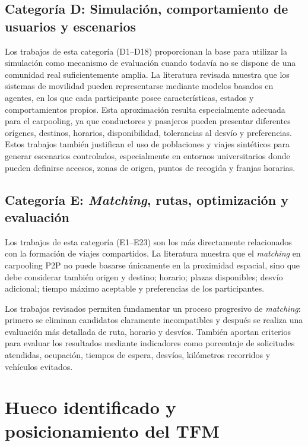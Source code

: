 \subsection{Categoría D: Simulación, comportamiento de usuarios y escenarios}

Los trabajos de esta categoría (D1--D18) \cite{D1,D2,D3,D4,D5,D6,D7,D8,D9,D10,D11,D12,D13,D14,D15,D16,D17,D18} proporcionan la base para utilizar la simulación como mecanismo de evaluación cuando todavía no se dispone de una comunidad real suficientemente amplia. La literatura revisada muestra que los sistemas de movilidad pueden representarse mediante modelos basados en agentes, en los que cada participante posee características, estados y comportamientos propios. Esta aproximación resulta especialmente adecuada para el carpooling, ya que conductores y pasajeros pueden presentar diferentes orígenes, destinos, horarios, disponibilidad, tolerancias al desvío y preferencias. Estos trabajos también justifican el uso de poblaciones y viajes sintéticos para generar escenarios controlados, especialmente en entornos universitarios donde pueden definirse accesos, zonas de origen, puntos de recogida y franjas horarias.

\subsection{Categoría E: \textit{Matching}, rutas, optimización y evaluación}

Los trabajos de esta categoría (E1--E23) \cite{E1,E2,E3,E4,E5,E6,E7,E8,E9,E10,E11,E12,E13,E14,E15,E16,E17,E18,E19,E20,E21,E22,E23} son los más directamente relacionados con la formación de viajes compartidos. La literatura muestra que el \textit{matching} en carpooling P2P no puede basarse únicamente en la proximidad espacial, sino que debe considerar también origen y destino; horario; plazas disponibles; desvío adicional; tiempo máximo aceptable y preferencias de los participantes.

Los trabajos revisados permiten fundamentar un proceso progresivo de \textit{matching}: primero se eliminan candidatos claramente incompatibles y después se realiza una evaluación más detallada de ruta, horario y desvíos. También aportan criterios para evaluar los resultados mediante indicadores como porcentaje de solicitudes atendidas, ocupación, tiempos de espera, desvíos, kilómetros recorridos y vehículos evitados.

\section{Hueco identificado y posicionamiento del TFM}

